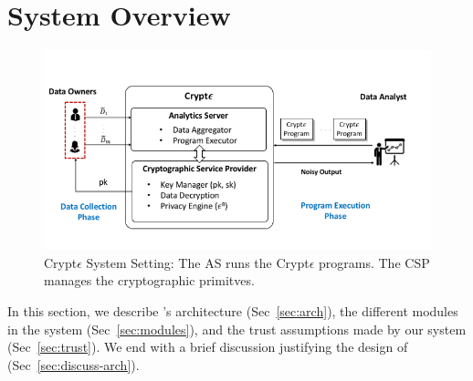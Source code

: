 \section{System Overview}\label{sec:overview}

\begin{figure}
\includegraphics[width=\columnwidth]{diag.png}\caption{ Crypt$\epsilon$ System Setting: The  \textsf{AS} runs the Crypt$\epsilon$ programs. The \textsf{CSP} manages the cryptographic primitves. } \end{figure}

In this section, we describe \system's architecture (Sec~\ref{sec:arch}), the different modules in the system (Sec~\ref{sec:modules}), and the trust assumptions made by our system (Sec~\ref{sec:trust}). We end with a brief discussion justifying the design of \system (Sec~\ref{sec:discuss-arch}). 

